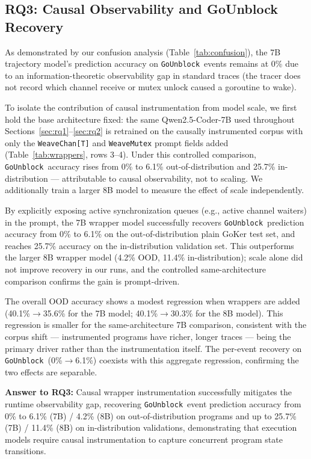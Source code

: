 \documentclass[10pt,conference]{IEEEtran}
\newcommand{\eunblock}{\texttt{GoUnblock}}
\begin{document}
\subsection{RQ3: Causal Observability and GoUnblock Recovery}\label{sec:rq3}

As demonstrated by our confusion analysis (Table~\ref{tab:confusion}), the 7B trajectory model's prediction accuracy on \eunblock\ events remains at 0\% due to an information-theoretic observability gap in standard traces (the tracer does not record which channel receive or mutex unlock caused a goroutine to wake).

To isolate the contribution of causal instrumentation from model scale, we first hold the base architecture fixed: the same Qwen2.5-Coder-7B used throughout Sections~\ref{sec:rq1}--\ref{sec:rq2} is retrained on the causally instrumented corpus with only the \texttt{WeaveChan[T]} and \texttt{WeaveMutex} prompt fields added (Table~\ref{tab:wrappers}, rows 3--4). Under this controlled comparison, \eunblock\ accuracy rises from 0\% to 6.1\% out-of-distribution and 25.7\% in-distribution — attributable to causal observability, not to scaling. We additionally train a larger 8B model to measure the effect of scale independently.

By explicitly exposing active synchronization queues (e.g., active channel waiters) in the prompt, the 7B wrapper model successfully recovers \eunblock\ prediction accuracy from 0\% to 6.1\% on the out-of-distribution plain GoKer test set, and reaches 25.7\% accuracy on the in-distribution validation set. This outperforms the larger 8B wrapper model (4.2\% OOD, 11.4\% in-distribution); scale alone did not improve recovery in our runs, and the controlled same-architecture comparison confirms the gain is prompt-driven.

The overall OOD accuracy shows a modest regression when wrappers are added (40.1\%$\to$35.6\% for the 7B model; 40.1\%$\to$30.3\% for the 8B model). This regression is smaller for the same-architecture 7B comparison, consistent with the corpus shift — instrumented programs have richer, longer traces — being the primary driver rather than the instrumentation itself. The per-event recovery on \eunblock\ (0\%$\to$6.1\%) coexists with this aggregate regression, confirming the two effects are separable.

\noindent\colorbox{panelgray}{\parbox{\dimexpr\columnwidth-2\fboxsep\relax}{
\textbf{Answer to RQ3:} Causal wrapper instrumentation successfully mitigates the runtime observability gap, recovering \eunblock\ event prediction accuracy from 0\% to 6.1\% (7B) / 4.2\% (8B) on out-of-distribution programs and up to 25.7\% (7B) / 11.4\% (8B) on in-distribution validations, demonstrating that execution models require causal instrumentation to capture concurrent program state transitions.
}}
\end{document}
